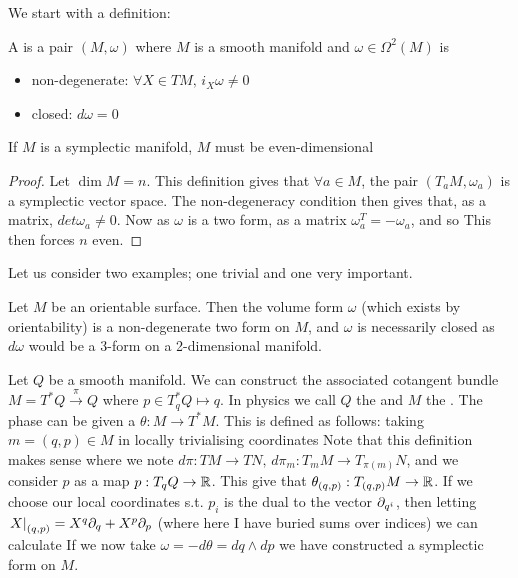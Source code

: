 \documentclass{article}
\begin{document}
We start with a definition:

\begin{definition}
A  is a pair $(M,\omega)$ where $M$ is a smooth manifold and $\omega \in \Omega^2(M)$ is 
\begin{itemize}
    \item non-degenerate: $\forall X \in TM, \, i_X \omega \neq 0$
    \item closed: $d\omega = 0$
\end{itemize}
\end{definition}

\begin{prop}
If $M$ is a symplectic manifold, $M$ must be even-dimensional
\end{prop}
\begin{proof}
Let $\dim M = n$. This definition gives that $\forall a \in M$, the pair $(T_aM,\omega_a)$ is a symplectic vector space. The non-degeneracy condition then gives that, as a matrix, $det \omega_a \neq 0$. Now as $\omega$ is a two form, as a matrix $\omega_a^T = - \omega_a$, and so 
This then forces $n$ even. 
\end{proof}

Let us consider two examples; one trivial and one very important. 

\begin{example}
Let $M$ be an orientable surface. Then the volume form $\omega$ (which exists by orientability) is a non-degenerate two form on $M$, and $\omega$ is necessarily closed as $d\omega$ would be a 3-form on a 2-dimensional manifold. 
\end{example}


\begin{example}\label{ex:CQIS:phasespace}
Let $Q$ be a smooth manifold. We can construct the associated cotangent bundle $M = T^\ast Q \overset{\pi}{\to} Q$ where $p \in T^\ast_q Q \mapsto q$. In physics we call $Q$ the  and $M$ the . The phase can be given a  $\theta : M \to T^\ast M$. This is defined as follows: taking $m=(q,p)\in M$ in locally trivialising coordinates
Note that this definition makes sense where we note $d\pi : TM \to TN, \, d\pi_m: T_mM \to T_{\pi(m)}N$, and we consider $p$ as a map $p : T_qQ \to \mathbb{R}$. This give that $\theta_{(q,p)} : T_{(q,p)}M \to \mathbb{R}$. If we choose our local coordinates s.t. $p_i$ is the dual to the vector $\partial_{q^i}$, then letting $\left. X \right\rvert_{(q,p)} = X^q\partial_q + X^p \partial_p$ (where here I have buried sums over indices) we can calculate
If we now take $\omega = -d\theta = dq \wedge dp$ we have constructed a symplectic form on $M$.  
\end{example}
\end{document}
